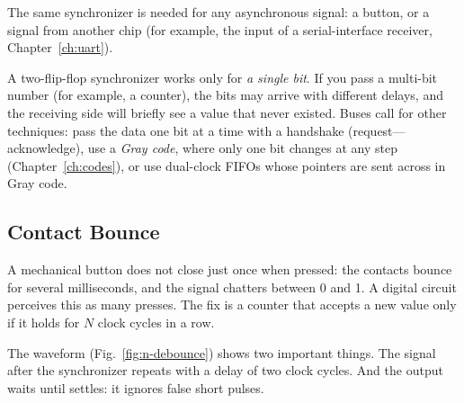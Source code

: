 

The same synchronizer is needed for any asynchronous signal: a button, or a
signal from another chip (for example, the input of a serial-interface
receiver, Chapter~\ref{ch:uart}).

\begin{warnbox}
A two-flip-flop synchronizer works only for \emph{a single bit}. If you pass a
multi-bit number (for example, a counter), the bits may arrive with different
delays, and the receiving side will briefly see a value that never existed.
Buses call for other techniques: pass the data one bit at a time with a
handshake (request---acknowledge), use a \emph{Gray code}, where only one bit
changes at any step (Chapter~\ref{ch:codes}), or use dual-clock FIFOs whose
pointers are sent across in Gray code.
\end{warnbox}

\subsection{Contact Bounce}

A mechanical button does not close just once when pressed: the contacts bounce
for several milliseconds, and the signal chatters between 0 and 1. A digital
circuit perceives this as many presses. The fix is a counter that accepts a
new value only if it holds for $N$ clock cycles in a row.


The waveform (Fig.~\ref{fig:n-debounce}) shows two important things. The signal
 after the synchronizer repeats  with a delay of two clock
cycles. And the output  waits until  settles: it ignores
false short pulses.


